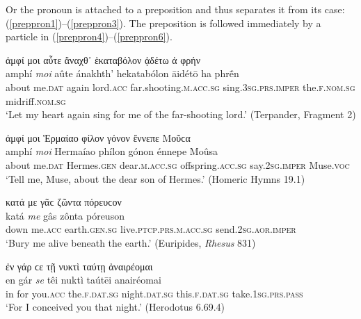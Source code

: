 Or the pronoun is attached to a preposition and thus separates it from its case: (\ref{preppron1})--(\ref{preppron3}). The preposition is followed immediately by a particle in (\ref{preppron4})--(\ref{preppron6}).

\begin{exe}
\ex ἀμφί μοι αὖτε ἄναχθ᾽ ἑκαταβόλον ᾀδέτω ἁ φρήν\\
\gll amphí \emph{moi} aûte ánakhth' hekatabólon āidétō ha phrḗn\\
about me.\textsc{dat} again lord.\textsc{acc} far.shooting\textsc{.m.acc.sg} sing.\textsc{3sg.prs.imper} the.\textsc{f.nom.sg} midriff.\textsc{nom.sg}\\
\trans `Let my heart again sing for me of the far-shooting lord.' (Terpander, Fragment 2)
\label{preppron1}
\end{exe}

\begin{exe}
\ex ἀμφί μοι Ἑρμαίαο φίλον γόνον ἔννεπε Μοῦϲα\\
\gll amphí \emph{moi} Hermaíao phílon gónon énnepe Moûsa\\
about me.\textsc{dat} Hermes.\textsc{gen} dear.\textsc{m.acc.sg}
offspring.\textsc{acc.sg} say.\textsc{2sg.imper} Muse.\textsc{voc}\\
\trans `Tell me, Muse, about the dear son of Hermes.' (Homeric Hymns 19.1)
\label{preppron2}
\end{exe}

\begin{exe}
\ex κατά με γᾶϲ ζῶντα πόρευϲον\\
\gll katá \emph{me} gâs zônta póreuson\\
down me.\textsc{acc} earth.\textsc{gen.sg} live.\textsc{ptcp.prs.m.acc.sg} send.\textsc{2sg.aor.imper}\\
\trans `Bury me alive beneath the earth.' (Euripides, \textit{Rhesus} 831)
\label{preppron3}
\end{exe}

\begin{exe}
\ex ἐν γάρ ϲε τῇ νυκτὶ ταύτῃ ἀναιρέομαι\\
\gll en gár \emph{se} têi nuktì taútēi anairéomai\\
in for you.\textsc{acc} the.\textsc{f.dat.sg} night.\textsc{dat.sg}
this.\textsc{f.dat.sg} take.\textsc{1sg.prs.pass}\\
\trans `For I conceived you that night.' (Herodotus 6.69.4)
\label{preppron4}
\end{exe}

